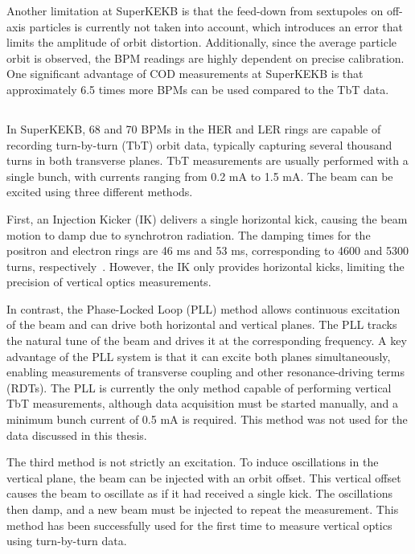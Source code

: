 Another limitation at SuperKEKB is that the feed-down from sextupoles on off-axis particles is 
currently not taken into account, which introduces an error that limits the amplitude of orbit
distortion.  Additionally, since the average particle orbit is observed, the BPM readings are highly
dependent on precise calibration.  One significant advantage of COD measurements at SuperKEKB is
that approximately 6.5 times more BPMs can be used compared to the TbT data.


\subsection{}

In SuperKEKB, 68 and 70 BPMs in the HER and LER rings are capable of recording turn-by-turn (TbT)
orbit data, typically capturing several thousand turns in both transverse planes. TbT measurements
are usually performed with a single bunch, with currents ranging from 0.2 mA to 1.5 mA. The beam can
be excited using three different methods.

First, an Injection Kicker (IK) delivers a single horizontal kick, causing the beam motion to damp
due to synchrotron radiation. The damping times for the positron and electron rings are 46 ms and 53
ms, corresponding to 4600 and 5300 turns, respectively~\cite{keintzel_jacqueline_beam_2022}.
However, the IK only provides horizontal kicks, limiting the precision of vertical optics
measurements.

In contrast, the Phase-Locked Loop (PLL) method allows continuous excitation of the beam and can
drive both horizontal and vertical planes. The PLL tracks the natural tune of the beam and drives it
at the corresponding frequency. A key advantage of the PLL system is that it can excite both planes
simultaneously, enabling measurements of transverse coupling and other resonance-driving terms
(RDTs). The PLL is currently the only method capable of performing vertical TbT measurements,
although data acquisition must be started manually, and a minimum bunch current of 0.5 mA is
required. This method was not used for the data discussed in this thesis.

The third method is not strictly an excitation. To induce oscillations in the vertical plane, the 
beam can be injected with an orbit offset. This vertical offset causes the beam to oscillate as if 
it had received a single kick. The oscillations then damp, and a new beam must be injected to repeat 
the measurement. This method has been successfully used for the first time to measure vertical
optics using turn-by-turn data.

